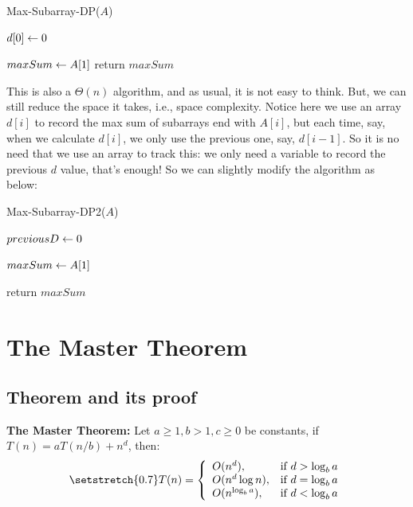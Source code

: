 \documentclass[11pt, a4paper]{COMP3711}
\begin{document}
\begin{spacing}{1.5}
    \begin{algorithm}
        \caption{Max-Subarray-DP($A$)}
        $d[0]\leftarrow 0$ \qquad {}

        $maxSum\leftarrow A[1]$\qquad {}
        return $maxSum$
    \end{algorithm}

    This is also a $\Theta(n)$ algorithm, and as usual, it is not easy 
    to think. But, we can still reduce the space it takes, i.e., 
    space complexity. Notice here we use an array $d[i]$ to record 
    the max sum of subarrays end with $A[i]$, but each time, 
    say, when we calculate $d[i]$, we only use the previous one,
    say, $d[i-1]$. So it is no need that we use an array to track this:
    we only need a variable to record the previous $d$ value,
    that's enough! So we can slightly modify the algorithm as below:

    \begin{algorithm}
        \caption{Max-Subarray-DP2($A$)}
        $previousD\leftarrow 0$ 

        $maxSum\leftarrow A[1]$

        return $maxSum$
    \end{algorithm}

    \section{The Master Theorem}

    \subsection{Theorem and its proof}

    {\bf The Master Theorem:} Let $a\ge 1, b>1, c\ge 0$
    be constants, if $T(n)=aT(n/b)+n^d$, then:
    \begin{align*}
        \setstretch{0.7}
        T(n)=\left\{ \begin{array}{ll}
            O(n^d), & \text{if } d>\log_b{a}\\
            O(n^d\log n), & \text{if } d = \log_b{a}\\
            O(n^{\log_b{a}}), & \text{if } d < \log_b{a}\\
        \end{array}\right.
    \end{align*}


\end{spacing}
\end{document}

